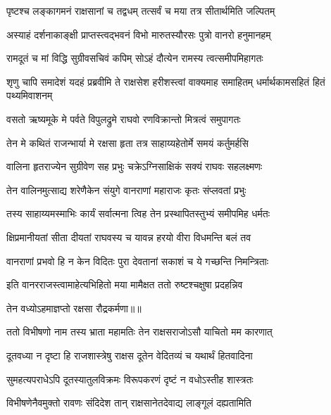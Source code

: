\twolineshloka
{पृष्टश्च लङ्कागमनं राक्षसानां च तद्वधम्}
{तत्सर्वं च मया तत्र सीतार्थमिति जल्पितम्} %

\twolineshloka
{अस्याहं दर्शनाकाङ्क्षी प्राप्तस्त्वद्भवनं विभो}
{मारुतस्यौरसः पुत्रो वानरो हनुमानहम्} %

\twolineshloka
{रामदूतं च मां विद्धि सुग्रीवसचिवं कपिम्}
{सोऽहं दौत्येन रामस्य त्वत्समीपमिहागतः} %

\threelineshloka
{शृणु चापि समादेशं यदहं प्रब्रवीमि ते}
{राक्षसेश हरीशस्त्वां वाक्यमाह समाहितम्}
{धर्मार्थकामसहितं हितं पथ्यमिवाशनम्} %

\twolineshloka
{वसतो ऋष्यमूके मे पर्वते विपुलद्रुमे}
{राघवो रणविक्रान्तो मित्रत्वं समुपागतः} %

\twolineshloka
{तेन मे कथितं राजन्भार्या मे रक्षसा हृता}
{तत्र साहाय्यहेतोर्मे समयं कर्तुमर्हसि} %

\twolineshloka
{वालिना हृतराज्येन सुग्रीवेण सह प्रभुः}
{चक्रेऽग्निसाक्षिकं सक्यं राघवः सहलक्ष्मणः} %

\twolineshloka
{तेन वालिनमुत्साद्य शरेणैकेन संयुगे}
{वानराणां महाराजः कृतः संप्लवतां प्रभुः} %

\twolineshloka
{तस्य साहाय्यमस्माभिः कार्यं सर्वात्मना त्विह}
{तेन प्रस्थापितस्तुभ्यं समीपमिह धर्मतः} %

\twolineshloka
{क्षिप्रमानीयतां सीता दीयतां राघवस्य च}
{यावन्न हरयो वीरा विधमन्ति बलं तव} %

\twolineshloka
{वानराणां प्रभवो हि न केन विदितः पुरा}
{देवतानां सकाशं च ये गच्छन्ति निमन्त्रिताः} %

\twolineshloka
{इति वानरराजस्त्वामाहेत्यभिहितो मया}
{मामैक्षत ततो रुष्टश्चक्षुषा प्रदहन्निव} %

{तेन वध्योऽहमाज्ञप्तो रक्षसा रौद्रकर्मणा॥॥} %

\addtocounter{shlokacount}{1}

\twolineshloka
{ततो विभीषणो नाम तस्य भ्राता महामतिः}
{तेन राक्षसराजोऽसौ याचितो मम कारणात्} %

\twolineshloka
{दूतवध्या न दृष्टा हि राजशास्त्रेषु राक्षस}
{दूतेन वेदितव्यं च यथार्थं हितवादिना} %

\twolineshloka
{सुमहत्यपराधेऽपि दूतस्यातुलविक्रमः}
{विरूपकरणं दृष्टं न वधोऽस्तीह शास्त्रतः} %

\twolineshloka
{विभीषणेनैवमुक्तो रावणः संदिदेश तान्}
{राक्षसानेतदेवाद्य लाङ्गूलं दह्यतामिति} %

